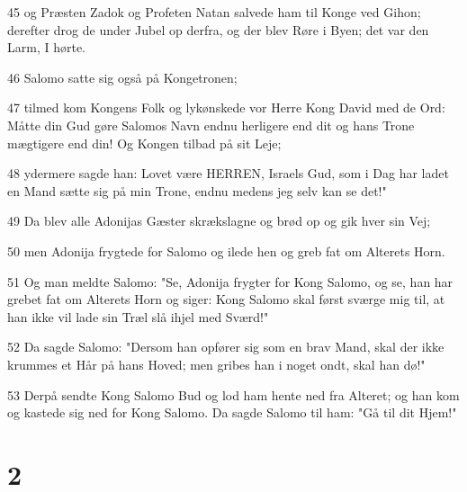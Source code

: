 \par 45 og Præsten Zadok og Profeten Natan salvede ham til Konge ved Gihon; derefter drog de under Jubel op derfra, og der blev Røre i Byen; det var den Larm, I hørte.
\par 46 Salomo satte sig også på Kongetronen;
\par 47 tilmed kom Kongens Folk og lykønskede vor Herre Kong David med de Ord: Måtte din Gud gøre Salomos Navn endnu herligere end dit og hans Trone mægtigere end din! Og Kongen tilbad på sit Leje;
\par 48 ydermere sagde han: Lovet være HERREN, Israels Gud, som i Dag har ladet en Mand sætte sig på min Trone, endnu medens jeg selv kan se det!"
\par 49 Da blev alle Adonijas Gæster skrækslagne og brød op og gik hver sin Vej;
\par 50 men Adonija frygtede for Salomo og ilede hen og greb fat om Alterets Horn.
\par 51 Og man meldte Salomo: "Se, Adonija frygter for Kong Salomo, og se, han har grebet fat om Alterets Horn og siger: Kong Salomo skal først sværge mig til, at han ikke vil lade sin Træl slå ihjel med Sværd!"
\par 52 Da sagde Salomo: "Dersom han opfører sig som en brav Mand, skal der ikke krummes et Hår på hans Hoved; men gribes han i noget ondt, skal han dø!"
\par 53 Derpå sendte Kong Salomo Bud og lod ham hente ned fra Alteret; og han kom og kastede sig ned for Kong Salomo. Da sagde Salomo til ham: "Gå til dit Hjem!"

\chapter{2}


